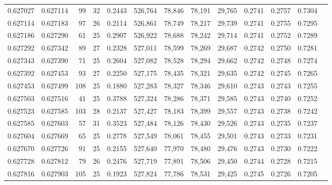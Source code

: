 \begin{tabular}{rrrrrrrrrrrrr}
0.627027 & 0.627114 &  99 &  32 &                                     0.2443 & 526,764 &  78,846 &  78,191 &  29,765 & 0.2741 & 0.2757 & 0.7304 \\
0.627114 & 0.627183 &  97 &  26 &                                     0.2114 & 526,861 &  78,749 &  78,217 &  29,739 & 0.2741 & 0.2755 & 0.7295 \\
0.627186 & 0.627290 &  61 &  25 &                                     0.2907 & 526,922 &  78,688 &  78,242 &  29,714 & 0.2741 & 0.2752 & 0.7289 \\
0.627292 & 0.627342 &  89 &  27 &                                     0.2328 & 527,011 &  78,599 &  78,269 &  29,687 & 0.2742 & 0.2750 & 0.7281 \\
0.627343 & 0.627390 &  71 &  25 &                                     0.2604 & 527,082 &  78,528 &  78,294 &  29,662 & 0.2742 & 0.2748 & 0.7274 \\
0.627392 & 0.627453 &  93 &  27 &                                     0.2250 & 527,175 &  78,435 &  78,321 &  29,635 & 0.2742 & 0.2745 & 0.7265 \\
0.627453 & 0.627499 & 108 &  25 &                                     0.1880 & 527,283 &  78,327 &  78,346 &  29,610 & 0.2743 & 0.2743 & 0.7255 \\
0.627503 & 0.627516 &  41 &  25 &                                     0.3788 & 527,324 &  78,286 &  78,371 &  29,585 & 0.2743 & 0.2740 & 0.7252 \\
0.627523 & 0.627585 & 103 &  28 &                                     0.2137 & 527,427 &  78,183 &  78,399 &  29,557 & 0.2743 & 0.2738 & 0.7242 \\
0.627585 & 0.627603 &  57 &  31 &                                     0.3523 & 527,484 &  78,126 &  78,430 &  29,526 & 0.2743 & 0.2735 & 0.7237 \\
0.627604 & 0.627669 &  65 &  25 &                                     0.2778 & 527,549 &  78,061 &  78,455 &  29,501 & 0.2743 & 0.2733 & 0.7231 \\
0.627670 & 0.627726 &  91 &  25 &                                     0.2155 & 527,640 &  77,970 &  78,480 &  29,476 & 0.2743 & 0.2730 & 0.7222 \\
0.627728 & 0.627812 &  79 &  26 &                                     0.2476 & 527,719 &  77,891 &  78,506 &  29,450 & 0.2744 & 0.2728 & 0.7215 \\
0.627816 & 0.627903 & 105 &  25 &                                     0.1923 & 527,824 &  77,786 &  78,531 &  29,425 & 0.2745 & 0.2726 & 0.7205 \\

\end{tabular}
